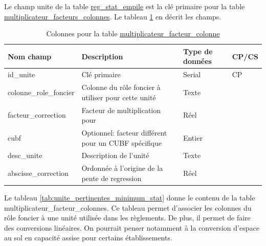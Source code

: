     Le champ unite de la table \underline{reg\_stat\_empile} est la clé primaire pour la table \underline{multiplicateur\_facteurs\_colonnes}. Le tableau \ref{tab:definition_unite} en décrit les champs.\par
    \begin{table}[h]
       \centering
       \begin{tabular}{m{}|m{}m{}m{}}
            \hline
            Nom champ & Description & Type de données & CP/CS  \\
            \hline
            id\_unite & Clé primaire  & Serial & CP \\  
            colonne\_role\_foncier & Colonne du rôle foncier à utiliser pour cette unité & Texte & \\
            facteur\_correction & Facteur de multiplication pour & Réel & \\
            cubf & Optionnel: facteur différent pour un CUBF spécifique & Entier & \\
            desc\_unite & Description de l'unité & Texte & \\
            \rowcolor{red}abscisse\_correction & Ordonnée à l'origine de la pente de regression & Réel &  \\
            \hline
       \end{tabular}
       \caption{Colonnes pour la table \underline{multiplicateur\_facteur\_colonne}}
       \label{tab:definition_unite}
    \end{table}   
    \clearpage
    Le tableau \ref{tab:unite_pertinentes_minimum_stat} donne  le contenu de la table multiplicateur\_facteur\_colonnes. Ce tableau permet d'associer les colonnes du rôle foncier à une unité utilisée dans les règlements. De plus, il permet de faire des conversions linéaires. On pourrait penser notamment à la conversion d'espace au sol en capacité assise pour certains établissements.\par
